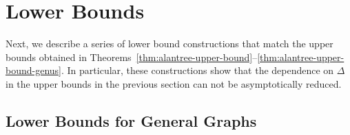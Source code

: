 \documentclass[lotsofwhite]{patmorin}
\begin{document}
\section{Lower Bounds}

Next, we describe a series of lower bound
constructions that match the upper bounds obtained in
Theorems~\ref{thm:alantree-upper-bound}--\ref{thm:alantree-upper-bound-genus}.
In particular, these constructions show that the dependence on $\Delta$
in the upper bounds in the previous section can not be asymptotically
reduced.

%
%

\subsection{Lower Bounds for General Graphs}
\end{document}
